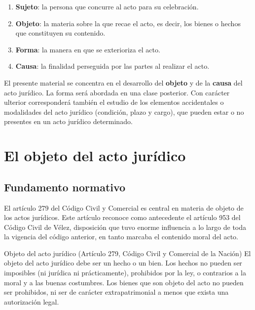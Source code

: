 \documentclass[12pt,oneside]{book}
\begin{document}
\begin{enumerate}
    \item \textbf{Sujeto}: la persona que concurre al acto para su celebración.
    \item \textbf{Objeto}: la materia sobre la que recae el acto, es decir, los bienes o hechos que constituyen su contenido.
    \item \textbf{Forma}: la manera en que se exterioriza el acto.
    \item \textbf{Causa}: la finalidad perseguida por las partes al realizar el acto.
\end{enumerate}


El presente material se concentra en el desarrollo del \textbf{objeto} y de la \textbf{causa} del acto jurídico. La forma será abordada en una clase posterior. Con carácter ulterior corresponderá también el estudio de los elementos accidentales o modalidades del acto jurídico (condición, plazo y cargo), que pueden estar o no presentes en un acto jurídico determinado.

\chapter{El objeto del acto jurídico}

\section{Fundamento normativo}

El artículo 279 del Código Civil y Comercial es central en materia de objeto de los actos jurídicos. Este artículo reconoce como antecedente el artículo 953 del Código Civil de Vélez, disposición que tuvo enorme influencia a lo largo de toda la vigencia del código anterior, en tanto marcaba el contenido moral del acto.

\begin{definition}{Objeto del acto jurídico (Artículo 279, Código Civil y Comercial de la Nación)}
El objeto del acto jurídico debe ser un hecho o un bien. Los hechos no pueden ser imposibles (ni jurídica ni prácticamente), prohibidos por la ley, o contrarios a la moral y a las buenas costumbres. Los bienes que son objeto del acto no pueden ser prohibidos, ni ser de carácter extrapatrimonial a menos que exista una autorización legal.
\end{definition}
\end{document}
